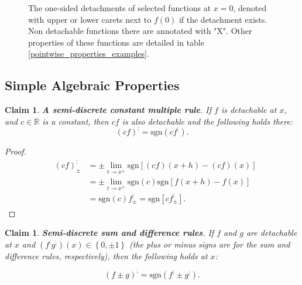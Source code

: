 \documentclass[11pt]{book}
\newtheorem{clm}[thm]{Claim}
\begin{document}
\begin{figure}
\begin{tabular}{ccc}
\end{tabular}
\caption{The one-sided detachments of selected functions at $x=0$, denoted with upper or lower carets next to $f\left(0\right)$ if the detachment exists. Non detachable functions there are annotated with "X". Other properties of these functions are detailed in table \ref{pointwise_properties_examples}.}
\label{functions_plots_with_detachments}
\end{figure}


\subsection{Simple Algebraic Properties}
\begin{clm}\label{constant_multiple_rule}\textbf{A semi-discrete constant multiple rule}. If $f$ is detachable at $x$, and $c\in \mathbb{R}$ is a constant, then $cf$ is also detachable and the following holds there:
$$\left(cf\right)^{;}=\text{sgn}\left(cf^{;}\right).$$
\end{clm}

\begin{proof}
\begin{align}
&\begin{aligned}\left(cf\right)_{\pm}^{;} &= \pm \underset{t\rightarrow x^{\pm}}{\lim}\text{sgn}\left[\left(cf\right)\left(x+h\right)-\left(cf\right)\left(x\right)\right] \\
&= \pm \underset{t\rightarrow x^{\pm}}{\lim}\text{sgn}\left(c\right)\text{sgn}\left[f\left(x+h\right)-f\left(x\right)\right]\\
&=\text{sgn}\left(c\right)f_{\pm}^{;}=\text{sgn}\left[cf_{\pm}^{;}\right].
\end{aligned}
\end{align}
\end{proof}

\begin{clm}\label{sum_rule}\textbf{Semi-discrete sum and difference rules}. If $f$ and $g$ are detachable at $x$ and $\left(f^{;} g^{;} \right) \left(x\right) \in \left\{0, \pm 1 \right \}$ (the plus or minus signs are for the sum and difference rules, respectively), then the following holds at $x$:

$$\left(f \pm g\right)^{;}=\text{sgn}\left( f^{;} \pm g^{;} \right).$$
\label{sum_rule}
\end{clm}
\end{document}
